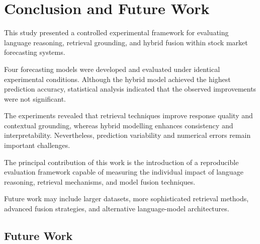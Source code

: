 \section{Conclusion and Future Work}\label{sec:conclusion}

This study presented a controlled experimental framework for evaluating
language reasoning, retrieval grounding, and hybrid fusion within stock
market forecasting systems.

Four forecasting models were developed and evaluated under identical
experimental conditions. Although the hybrid model achieved the highest
prediction accuracy, statistical analysis indicated that the observed
improvements were not significant.

The experiments revealed that retrieval techniques improve response
quality and contextual grounding, whereas hybrid modelling enhances
consistency and interpretability. Nevertheless, prediction variability
and numerical errors remain important challenges.

The principal contribution of this work is the introduction of a
reproducible evaluation framework capable of measuring the individual
impact of language reasoning, retrieval mechanisms, and model fusion
techniques.

Future work may include larger datasets, more sophisticated retrieval
methods, advanced fusion strategies, and alternative language-model
architectures.

\subsection{Future Work}\label{sec:future-work}

